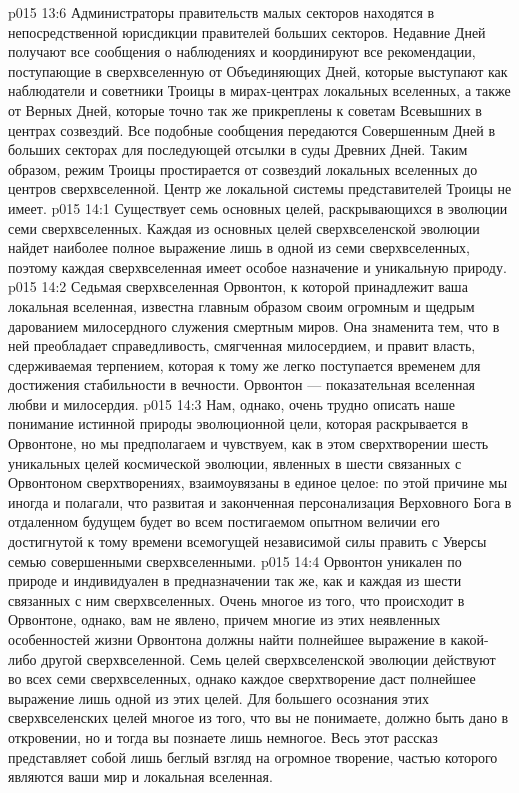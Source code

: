 \vs p015 13:6 Администраторы правительств малых секторов находятся в непосредственной юрисдикции правителей больших секторов. Недавние Дней получают все сообщения о наблюдениях и координируют все рекомендации, поступающие в сверхвселенную от Объединяющих Дней, которые выступают как наблюдатели и советники Троицы в мирах\hyp{}центрах локальных вселенных, а также от Верных Дней, которые точно так же прикреплены к советам Всевышних в центрах созвездий. Все подобные сообщения передаются Совершенным Дней в больших секторах для последующей отсылки в суды Древних Дней. Таким образом, режим Троицы простирается от созвездий локальных вселенных до центров сверхвселенной. Центр же локальной системы представителей Троицы не имеет.
\vs p015 14:1 Существует семь основных целей, раскрывающихся в эволюции семи сверхвселенных. Каждая из основных целей сверхвселенской эволюции найдет наиболее полное выражение лишь в одной из семи сверхвселенных, поэтому каждая сверхвселенная имеет особое назначение и уникальную природу.
\vs p015 14:2 Седьмая сверхвселенная Орвонтон, к которой принадлежит ваша локальная вселенная, известна главным образом своим огромным и щедрым дарованием милосердного служения смертным миров. Она знаменита тем, что в ней преобладает справедливость, смягченная милосердием, и правит власть, сдерживаемая терпением, которая к тому же легко поступается временем для достижения стабильности в вечности. Орвонтон --- показательная вселенная любви и милосердия.
\vs p015 14:3 Нам, однако, очень трудно описать наше понимание истинной природы эволюционной цели, которая раскрывается в Орвонтоне, но мы предполагаем и чувствуем, как в этом сверхтворении шесть уникальных целей космической эволюции, явленных в шести связанных с Орвонтоном сверхтворениях, взаимоувязаны в единое целое: по этой причине мы иногда и полагали, что развитая и законченная персонализация Верховного Бога в отдаленном будущем будет во всем постигаемом опытном величии его достигнутой к тому времени всемогущей независимой силы править с Уверсы семью совершенными сверхвселенными.
\vs p015 14:4 Орвонтон уникален по природе и индивидуален в предназначении так же, как и каждая из шести связанных с ним сверхвселенных. Очень многое из того, что происходит в Орвонтоне, однако, вам не явлено, причем многие из этих неявленных особенностей жизни Орвонтона должны найти полнейшее выражение в какой\hyp{}либо другой сверхвселенной. Семь целей сверхвселенской эволюции действуют во всех семи сверхвселенных, однако каждое сверхтворение даст полнейшее выражение лишь одной из этих целей. Для большего осознания этих сверхвселенских целей многое из того, что вы не понимаете, должно быть дано в откровении, но и тогда вы познаете лишь немногое. Весь этот рассказ представляет собой лишь беглый взгляд на огромное творение, частью которого являются ваши мир и локальная вселенная.
